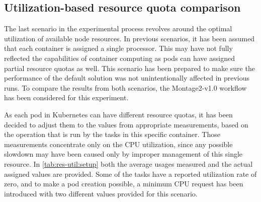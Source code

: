 \subsection{Utilization-based resource quota comparison}\label{s:Evaluation:ResourceOptimal}


The last scenario in the experimental process revolves around the optimal utilization of available node resources.
In previous scenarios, it has been assumed that each container is assigned a single processor.
This may have not fully reflected the capabilities of container computing as pods can have assigned partial resource quotas as well. 
This scenario has been prepared to make sure the performance of the default solution was not unintentionally affected in previous runs.
To compare the results from both scenarios, the Montage2-v1.0 workflow has been considered for this experiment.

As each pod in Kubernetes can have different resource quotas, it has been decided to adjust them to the values from appropriate measurements, based on the operation that is run by the tasks in this specific container.
Those measurements concentrate only on the CPU utilization, since any possible slowdown may have been caused only by improper management of this single resource.
In \cref{tab:res-util:setup} both the average usages measured and the actual assigned values are provided.
Some of the tasks have a reported utilization rate of zero, and to make a pod creation possible, a minimum CPU request has been introduced with two different values provided for this scenario.



